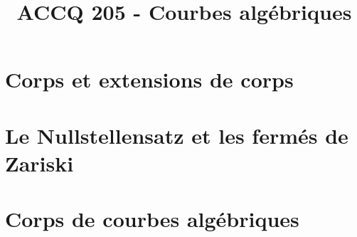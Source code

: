 \documentclass[a4paper,9pt]{article}
\title{\vspace{-1.2cm} \textbf{ACCQ 205 - Courbes algébriques}}
\begin{document}
\maketitle

\vspace{-1.5cm}

\section{Corps et extensions de corps}
	

\section{Le Nullstellensatz et les fermés de Zariski}
	

\section{Corps de courbes algébriques}
	
\end{document}
